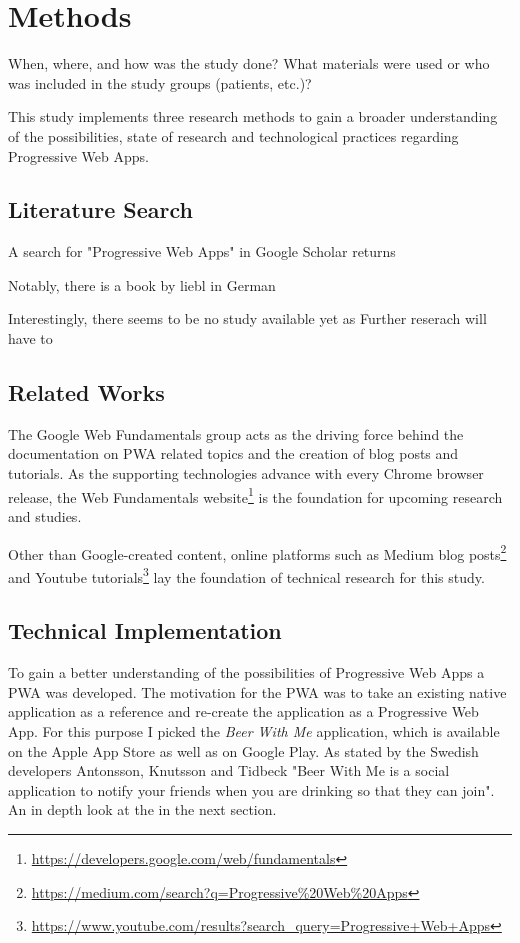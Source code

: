\chapter{Methods}
When, where, and how was the study done? What materials were used or who was included in the study groups (patients, etc.)?

This study implements three research methods to gain a broader understanding of the possibilities, state of research and technological practices regarding Progressive Web Apps.

\section{Literature Search}

A search for "Progressive Web Apps" in Google Scholar returns

Notably, there is a book by liebl in German

Interestingly, there seems to be no study available yet as
Further reserach will have to

\section{Related Works}
The Google Web Fundamentals group acts as the driving force behind the documentation on PWA related topics and the creation of blog posts and tutorials. As the supporting technologies advance with every Chrome browser release, the Web Fundamentals website\footnote{\url{https://developers.google.com/web/fundamentals}} is the foundation for upcoming research and studies.

Other than Google-created content, online platforms such as Medium blog posts\footnote{\url{https://medium.com/search?q=Progressive\%20Web\%20Apps}} and Youtube tutorials\footnote{\url{https://www.youtube.com/results?search_query=Progressive+Web+Apps}} lay the foundation of technical research for this study.

\section{Technical Implementation}
To gain a better understanding of the possibilities of Progressive Web Apps a PWA was developed. The motivation for the PWA was to take an existing native application as a reference and re-create the application as a Progressive Web App. For this purpose I picked the \textit{Beer With Me} application, which is available on the Apple App Store as well as on Google Play. As stated by the Swedish developers Antonsson, Knutsson and Tidbeck "Beer With Me is a social application to notify your friends when you are drinking so that they can join". An in depth look at the in the next section.
